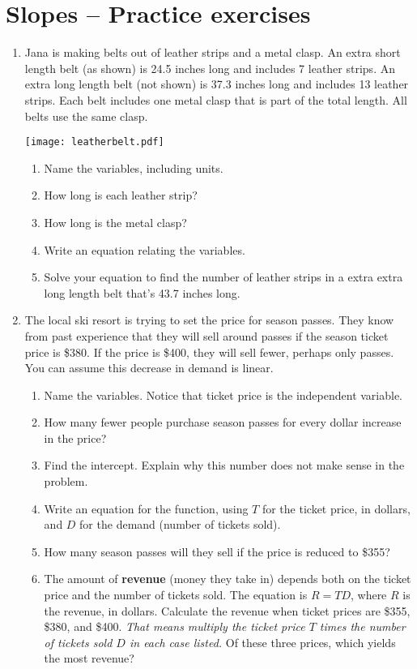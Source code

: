 \section{Slopes -- Practice exercises}

\begin{enumerate}
\item Jana is making belts out of leather strips and a metal clasp.  An extra short length belt (as shown) is 24.5 inches long and includes 7 leather strips.  An extra long length belt (not shown) is 37.3 inches long and includes 13 leather strips.  Each belt includes one metal clasp that is part of the total length.  All belts use the same clasp.
\begin{center}
\scalebox{.5} {\texttt{[image: leatherbelt.pdf]} }
\end{center}
\begin{enumerate}
\item Name the variables, including units. \vfill
\item How long is each leather strip? \vfill
\item How long is the metal clasp?  \vfill
\item Write an equation relating the variables. \vfill
\item Solve your equation to find the number of leather strips in a extra extra long length belt that's 43.7 inches long. \vfill \vfill
\end{enumerate}

\newpage %

\item The local ski resort is trying to set the price for season passes.  They know from past experience that they will sell around  passes if the season ticket price is \$380.  If the price is \$400, they will sell fewer, perhaps only  passes.  You can assume this decrease in demand is linear.
\begin{enumerate}
\item Name the variables.  Notice that ticket price is the independent variable. \vfill
\item How many fewer people purchase season passes for every dollar increase in the price? \vfill
\item Find the intercept.  Explain why this number does not make sense in the problem. \vfill
\item Write an equation for the function, using $T$ for the ticket price, in dollars, and $D$ for the demand (number of tickets sold). \vfill
\item How many season passes will they sell if the price is reduced to \$355? \vfill
\item The amount of \textbf{revenue} (money they take in) depends both on the ticket price and the number of tickets sold.  The equation is $R = TD$, where $R$ is the revenue, in dollars.  Calculate the revenue when ticket prices are \$355, \$380, and \$400.  \emph{That means multiply the ticket price $T$ times the number of tickets sold $D$ in each case listed.}  Of these three prices, which yields the most revenue? \vfill \vfill
\end{enumerate}


\end{enumerate}
